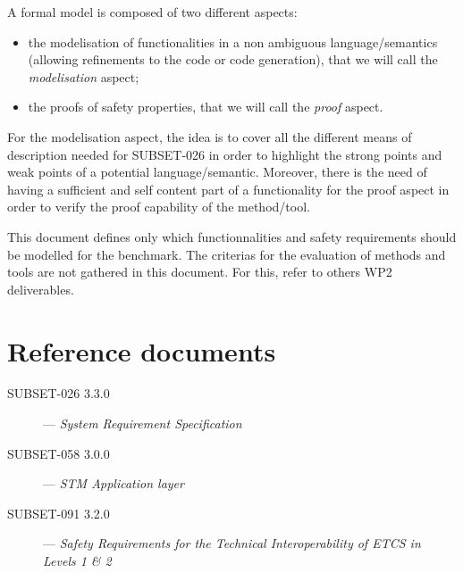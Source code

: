 \documentclass{template/openetcs_report}
\begin{document}
A formal model is composed of two different aspects:
\begin{itemize}
\item the modelisation of functionalities in a non ambiguous language/semantics (allowing refinements to the code or code generation), that we will call the \emph{modelisation} aspect;
\item the proofs of safety properties, that we will call the \emph{proof} aspect.
\end{itemize}

For the modelisation aspect, the idea is to cover all the different means of description needed for SUBSET-026 in order to highlight the strong points and weak points of a potential language/semantic.
Moreover, there is the need of having a sufficient and self content part of a functionality for the proof aspect in order to verify the proof capability of the method/tool.

This document defines only which functionnalities and safety requirements should be modelled for the benchmark. The criterias for the evaluation of methods and tools are not gathered in this document. For this, refer to others WP2 deliverables. 

\chapter{Reference documents}
\begin{description}
\item [SUBSET-026 3.3.0] --- \emph{System Requirement Specification}
\item [SUBSET-058 3.0.0] --- \emph{STM Application layer}
\item [SUBSET-091 3.2.0] --- \emph{Safety Requirements for the Technical Interoperability of ETCS in Levels 1 \& 2}
\end{description}
\end{document}
